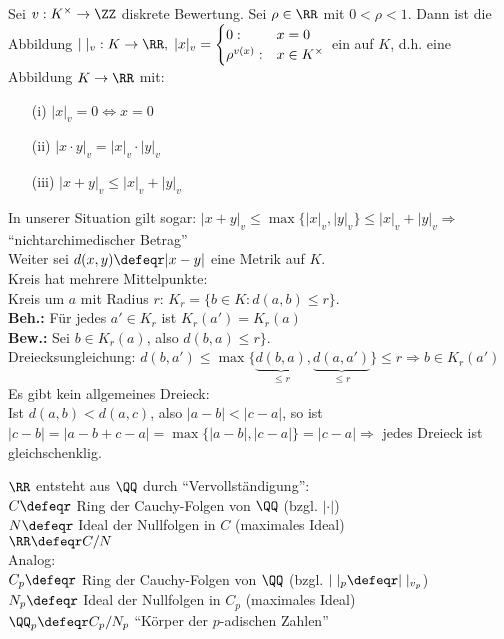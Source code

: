 \begin{Bem} 
Sei $v: K^{\times} \to \ZZ$ diskrete Bewertung.
Sei $\rho \in \RR$ mit $0 < \rho < 1$.
Dann ist die Abbildung $|\;|_v: K \to \RR, \; |x|_v = \begin{cases}0: & x
= 0 \\\rho^{v(x)}: & x \in K^{\times}\end{cases}$ ein
 auf $K$, d.h. eine Abbildung $K \to
\RR$ mit:
\begin{enumerate}
  \item[(i)] $|x|_v = 0 \Leftrightarrow x = 0$
  \item[(ii)] $|x \cdot y|_v = |x|_v \cdot |y|_v$
  \item[(iii)] $|x + y|_v \leq |x|_v + |y|_v$
\end{enumerate}
In unserer Situation gilt sogar: $|x + y|_v \leq \max\{|x|_v,|y|_v\} \leq |x|_v
+ |y|_v \Rightarrow$ ``nichtarchimedischer Betrag''\\
Weiter sei $d(x,y) \defeqr|x - y|$ eine Metrik auf $K$.\\
Kreis hat mehrere Mittelpunkte:\\
Kreis um $a$ mit Radius $r$: $K_r = \{b \in K: d(a,b) \leq r\}$.\\
\textbf{Beh.:} Für jedes $a' \in K_r$ ist $K_r(a') = K_r(a)$\\
\textbf{Bew.:} Sei $b \in K_r(a)$, also $d(b,a) \leq r\}$.\\
Dreiecksungleichung: $d(b,a') \leq \max\{\underset{\leq
r}{\underbrace{d(b,a)}},\underset{\leq r}{\underbrace{d(a,a')}}\} \leq r \Rightarrow b \in
K_r(a')$\\
Es gibt kein allgemeines Dreieck:\\
Ist $d(a,b) < d(a,c)$, also $|a-b| < |c-a|$, so ist $|c-b| = |a-b+c-a| =
\max\{|a-b|,|c-a|\} = |c-a| \Rightarrow$ jedes Dreieck ist gleichschenklig.
\end{Bem}

\begin{Eri}
$\RR$ entsteht aus $\QQ$ durch ``Vervollständigung'':\\
$C \defeqr$ Ring der Cauchy-Folgen von $\QQ$ (bzgl. $|\cdot|$)\\
$N \defeqr$ Ideal der Nullfolgen in $C$ (maximales Ideal)\\
$\RR \defeqr C/N$\\
Analog:\\
$C_p \defeqr$ Ring der Cauchy-Folgen von $\QQ$ (bzgl. $|\;|_p \defeqr
|\;|_{v_p}$)\\
$N_p \defeqr$ Ideal der Nullfolgen in $C_p$ (maximales Ideal)\\
$\QQ_p \defeqr C_p/N_p$ ``Körper der $p$-adischen Zahlen''
\end{Eri}

